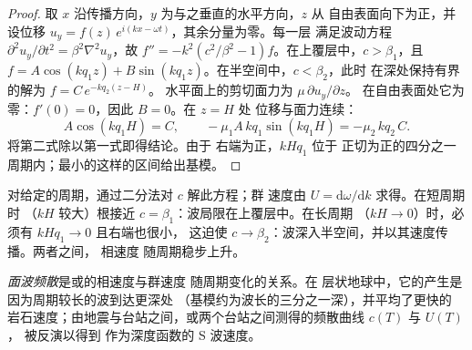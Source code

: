 \begin{proof}
取 $x$ 沿传播方向，$y$ 为与之垂直的水平方向，$z$ 从
自由表面向下为正，并设位移
$u_y = f(z)\,e^{i(kx - \omega t)}$，其余分量为零。每一层
满足波动方程 $\partial^2 u_y/\partial t^2 = \beta^2\nabla^2 u_y$，故
$f'' = -k^2\left(c^2/\beta^2 - 1\right) f$。在上覆层中，$c > \beta_1$，且
$f = A\cos(kq_1z) + B\sin(kq_1z)$。在半空间中，$c < \beta_2$，此时
在深处保持有界的解为 $f = C\,e^{-kq_2(z - H)}$。
水平面上的剪切面力为 $\mu\,\partial u_y/\partial z$。
在自由表面处它为零：$f'(0) = 0$，因此 $B = 0$。在 $z = H$ 处
位移与面力连续：
\[
  A\cos(kq_1H) = C, \qquad -\mu_1 A\,kq_1\sin(kq_1H) = -\mu_2\,kq_2\,C .
\]
将第二式除以第一式即得结论。由于
右端为正，$kHq_1$ 位于
正切为正的四分之一周期内；最小的这样的区间给出基模。
\end{proof}

对给定的周期，通过二分法对 $c$ 解此方程；群
速度由 $U = \mathrm d\omega/\mathrm dk$ 求得。在短周期时
（$kH$ 较大）根接近 $c = \beta_1$：波局限在上覆层中。在长周期
（$kH \to 0$）时，必须有 $kHq_1 \to 0$ 且右端也很小，
这迫使 $c \to \beta_2$：波深入半空间，并以其速度传播。两者之间，
相速度
随周期稳步上升。

\begin{definition}[面波频散]\label{def:b3:seismology-imaging:dispersion}
\emph{面波频散}是或的相速度与群速度
随周期变化的关系。在
层状地球中，它的产生是因为周期较长的波到达更深处
（基模约为波长的三分之一深），并平均了更快的
岩石速度；由地震与台站之间，或两个台站之间测得的频散曲线 $c(T)$ 与 $U(T)$，
被反演以得到
作为深度函数的 S 波速度。
\end{definition}

